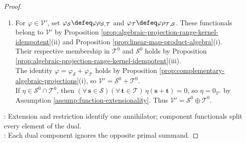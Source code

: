 \begin{theorem}
\begin{proof}
\begin{enumerate}[label=(\roman*)]
\item For $\varphi\in\mathcal{V}'$, set $\varphi_{\mathcal{S}}\defeq\varphi\rho_{\mathcal{S},\mathcal{T}}$ and $\varphi_{\mathcal{T}}\defeq\varphi\rho_{\mathcal{T},\mathcal{S}}$. These functionals belong to $\mathcal{V}'$ by Proposition \ref{prop:algebraic-projection-range-kernel-idempotent}(ii) and Proposition \ref{prop:linear-map-product-algebra}(i).\\
Their respective membership in $\mathcal{T}^0$ and $\mathcal{S}^0$ holds by Proposition \ref{prop:algebraic-projection-range-kernel-idempotent}(iii).\\
The identity $\varphi=\varphi_{\mathcal{S}}+\varphi_{\mathcal{T}}$ holds by Proposition \ref{prop:complementary-algebraic-projections}(i), so $\mathcal{V}'=\mathcal{S}^0+\mathcal{T}^0$.\\
If $\eta\in\mathcal{S}^0\cap\mathcal{T}^0$, then $(\forall\,\mathbf{s}\in\mathcal{S})(\forall\,\mathbf{t}\in\mathcal{T})\,\eta(\mathbf{s}+\mathbf{t})=0$, so $\eta=0_{\mathcal{V}'}$ by Assumption \ref{assump:function-extensionality}. Thus $\mathcal{V}'=\mathcal{S}^0\oplus\mathcal{T}^0$.
\end{enumerate}
: Extension and restriction identify one annihilator; component functionals split every element of the dual.\\
: Each dual component ignores the opposite primal summand.
\end{proof}
\end{theorem}


